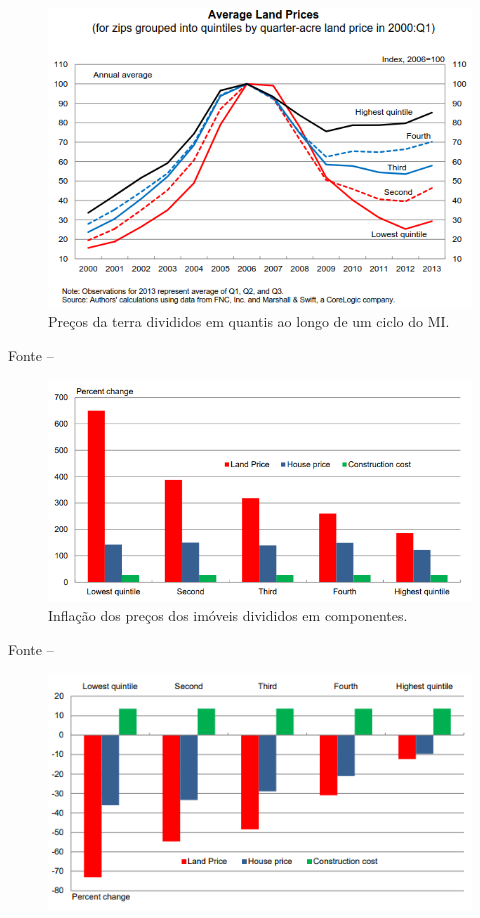 \documentclass[
	12pt,				%
	oneside,			%
	a4paper,			%
	chapter=TITLE,		%
	section=TITLE,		%
	english,			%
	brazil				%
	]{abntex2}
\newcommand{\bcenter}{\begin{center}}
\newcommand{\ecenter}{\end{center}}
\begin{document}
\begin{refsection}
\begin{figure}[H]
{\centering \includegraphics[width=0.7\linewidth]{images/PrecoTerraQuantis} 

}

\caption{Preços da terra divididos em quantis ao longo de um ciclo do \gls{MI}.}\label{fig:washington}
\end{figure}
\bcenter

\small Fonte -- \textcite{washington}
\ecenter
\begin{figure}[H]

{\centering \includegraphics[width=0.7\linewidth]{images/LandPricesInflation} 

}

\caption{Inflação dos preços dos imóveis divididos em componentes.}\label{fig:washington2}
\end{figure}
\bcenter

\small Fonte -- \textcite{washington}
\ecenter
\begin{figure}[H]

{\centering \includegraphics[width=0.7\linewidth]{images/LandPricesDisinflation} 

}
\end{figure}
\end{refsection}
\end{document}
